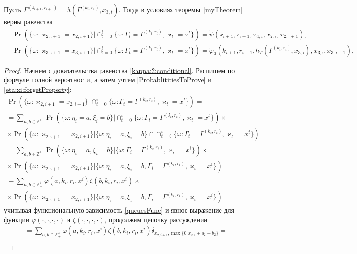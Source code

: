 \documentclass[a4paper,12pt,russian]{extarticle}
\newcommand{\ga}[1]{\Gamma^{\left( #1 \right)} }
\newcommand{\mll}[1]{\begin{multline*}#1\end{multline*}}
\begin{document}
\begin{corollary}
Пусть $\ga{k_{i+1},r_{i+1}}=h(\ga{k_i,r_i},x_{3,t})$. Тогда в условиях теоремы~\ref{myTheorem} верны равенства
\begin{align}
&\Pr (\{ \omega \colon \varkappa_{2,i+1} = x_{2,i+1}\} |\cap_{t=0}^{i}\{\omega\colon \Gamma_t=\ga{k_t,r_t}, \varkappa_t=x^t\})=\widetilde{\psi}(k_{i+1},r_{i+1},x_{4,i},x_{2,i},x_{2,i+1}),
\label{kappa:2:conditional}\\
&\Pr (\{ \omega \colon \varkappa_{3,i+1} = x_{3,i+1}\} |\cap_{t=0}^{i}\{\omega\colon \Gamma_t=\ga{k_t,r_t}, \varkappa_t=x^t\})=\widetilde{\varphi}_3(k_{i+1},r_{i+1},h_T(\ga{k_i,r_i},x_{3,i}),x_{3,i},x_{3,i+1}),
\label{kappa:3:conditional}
\end{align}
\end{corollary}
\begin{proof}
Начнем с доказательства равенства \eqref{kappa:2:conditional}. Распишем по формуле полной вероятности, а затем учтем \eqref{ProbablititiesToProve} и \eqref{eta:xi:forgetProperty}:
\mll
{
\Pr (\{ \omega \colon \varkappa_{2,i+1} = x_{2,i+1}\} |\cap_{t=0}^{i}\{\omega\colon \Gamma_t=\ga{k_t,r_t}, \varkappa_t=x^t\}) = \\
= \sum_{a,b\in \mathbb{Z}_+^4} \Pr (\{ \omega \colon \eta_i=a, \xi_i=b\} |\cap_{t=0}^{i}\{\omega\colon \Gamma_t=\ga{k_t,r_t}, \varkappa_t=x^t\}) \times \\
\times \Pr (\{ \omega \colon \varkappa_{2,i+1} = x_{2,i+1}\} |\{\omega\colon \eta_i=a, \xi_i=b\}\cap \cap_{t=0}^{i}\{\omega\colon \Gamma_t=\ga{k_t,r_t}, \varkappa_t=x^t\}) = \\
=\sum_{a,b\in \mathbb{Z}_+^4} \Pr (\{ \omega \colon \eta_i=a, \xi_i=b\} |\{\omega\colon \Gamma_i=\ga{k_i,r_i}, \varkappa_i=x^i\}) \times \\
\times \Pr (\{ \omega \colon \varkappa_{2,i+1} = x_{2,i+1}\} |\{\omega\colon \eta_i=a, \xi_i=b, \Gamma_i=\ga{k_i,r_i}, \varkappa_i=x^i\}) = \\
=\sum_{a,b\in \mathbb{Z}_+^4} \varphi(a,k_i,r_i,x^i)\zeta(b,k_i,r_i,x^i) \times\\
\times \Pr (\{ \omega \colon \varkappa_{2,i+1} = x_{2,i+1}\} |\{\omega\colon \eta_i=a, \xi_i=b, \Gamma_i=\ga{k_i,r_i}, \varkappa_i=x^i\})=
}
учитывая функциональную зависимость \eqref{queuesFunc} и явное выражение для функций $\varphi(\cdot, \cdot, \cdot, \cdot)$ и $\zeta(\cdot, \cdot, \cdot, \cdot)$, продолжим цепочку рассуждений
\mll
{
= \sum_{a,b\in \mathbb{Z}_+^4} \varphi(a,k_i,r_i,x^i)\zeta(b,k_i,r_i,x^i)  \delta_{x_{2,i+1},\max\{0,x_{2,i}+a_2-b_2\}} =\\
}
\end{proof}
\end{document}

